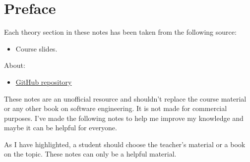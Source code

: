 \section*{Preface}

Each theory section in these notes has been taken from the following source:
\begin{itemize}
    \item Course slides.\cite{slides}
\end{itemize}
About:
\begin{itemize}
    \item[\faIcon{github}] \href{https://github.com/PoliMI-HPC-E-notes-projects-AndreVale69/HPC-E-PoliMI-university-notes}{GitHub repository}
\end{itemize}
These notes are an unofficial resource and shouldn't replace the course material or any other book on software engineering. It is not made for commercial purposes. I've made the following notes to help me improve my knowledge and maybe it can be helpful for everyone.

As I have highlighted, a student should choose the teacher's material or a book on the topic. These notes can only be a helpful material.